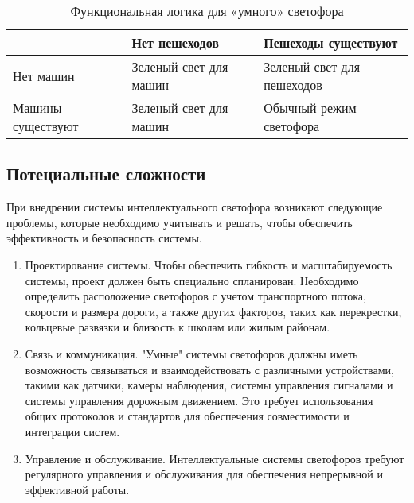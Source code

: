 \newpage

\begin{table}[H]
		\captionsetup{justification=raggedright, singlelinecheck=false}
	\caption[]{\label{tab:1} Функциональная логика для «умного» светофора}
	\begin{center}
		\begin{tabular}{|p{5cm}|p{5cm}|p{5cm}|}
			\hline
			 & Нет пешеходов & Пешеходы существуют \\
			\hline
			Нет машин & Зеленый свет для машин & Зеленый свет для пешеходов   \\
			\hline
			Машины существуют & Зеленый свет для машин  & Обычный режим светофора  \\
			\hline
		\end{tabular}

	\end{center}
\end{table}

\subsection{Потециальные сложности}
При внедрении системы интеллектуального светофора возникают следующие проблемы, которые необходимо учитывать и решать, чтобы обеспечить эффективность и безопасность системы.
\begin{enumerate}
    \item Проектирование системы. Чтобы обеспечить гибкость и масштабируемость системы, проект должен быть специально спланирован. Необходимо определить расположение светофоров с учетом транспортного потока, скорости и размера дороги, а также других факторов, таких как перекрестки, кольцевые развязки и близость к школам или жилым районам.
    \item Связь и коммуникация. "Умные" системы светофоров должны иметь возможность связываться и взаимодействовать с различными устройствами, такими как датчики, камеры наблюдения, системы управления сигналами и системы управления дорожным движением. Это требует использования общих протоколов и стандартов для обеспечения совместимости и интеграции систем.
    \item Управление и обслуживание. Интеллектуальные системы светофоров требуют регулярного управления и обслуживания для обеспечения непрерывной и эффективной работы.
\end{enumerate}

